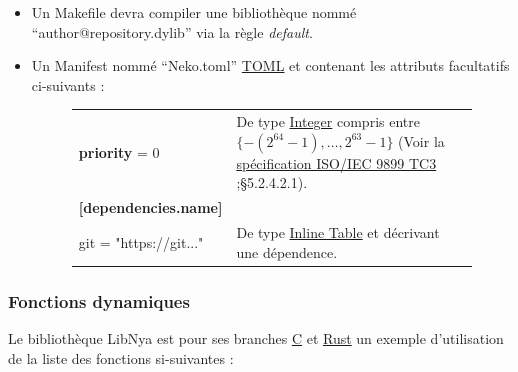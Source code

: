 \documentclass{report}
\begin{document}
\begin{itemize}
	\item Un Makefile devra compiler une bibliothèque nommé \enquote{author@repository.dylib} via la règle \textit{default}.
	\item Un Manifest nommé \enquote{Neko.toml} \textendash{}\href{https://github.com/toml-lang/toml#toml}{TOML}\textendash{} et contenant les attributs facultatifs ci-suivants :
	\begin{figure}[!ht]
		\begin{minipage}{\textwidth}
		\centering
			\begin{tabular}{p{}p{}}
				\textbf{priority} = 0 & De type \href{https://github.com/toml-lang/toml#user-content-integer}{Integer} compris entre $\{-(2^{64}-1), \ldots{}, 2^{63}-1\}$ (Voir la \href{http://www.open-std.org/jtc1/sc22/wg14/www/docs/n1256.pdf}{spécification ISO/IEC 9899 TC3} ;\S{5.2.4.2.1}). \\
                \textbf{[dependencies.name]} \\ git = "https://git..." & De type \href{https://github.com/toml-lang/toml#inline-table}{Inline Table} et décrivant une dépendence. \\
			\end{tabular}
		\end{minipage}
	\end{figure}
\end{itemize}

\newpage
\subsubsection{Fonctions dynamiques \textendash{}}

Le bibliothèque LibNya est pour ses branches \href{https://github.com/Arukana/LibNya/tree/c}{C} et \href{https://github.com/Arukana/LibNya}{Rust} un exemple d'utilisation de la liste des fonctions si-suivantes : \\
\end{document}
